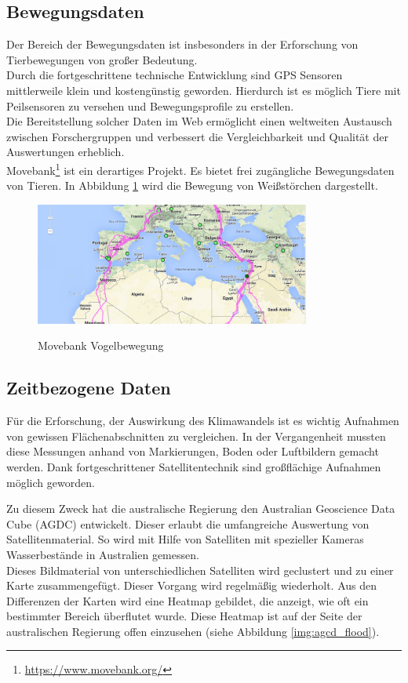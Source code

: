 \documentclass[10pt,conference,compsocconf]{IEEEtran}
\begin{document}
\subsection{Bewegungsdaten}
Der Bereich der Bewegungsdaten ist insbesonders in der Erforschung von Tierbewegungen von großer Bedeutung\cite{gps_collars}.\\
Durch die fortgeschrittene technische Entwicklung sind GPS Sensoren mittlerweile klein und kostengünstig geworden. Hierdurch ist es möglich Tiere mit Peilsensoren zu versehen und Bewegungsprofile zu erstellen.\\
Die Bereitstellung solcher Daten im Web ermöglicht einen weltweiten Austausch zwischen Forschergruppen und verbessert die Vergleichbarkeit und Qualität der Auswertungen erheblich.\\
Movebank\footnote{\url{https://www.movebank.org/}} ist ein derartiges Projekt. Es bietet frei zugängliche Bewegungsdaten von Tieren. In Abbildung \ref{img:movebank} wird die Bewegung von Weißstörchen dargestellt.

\begin{figure}[H]
  \centering
  	\includegraphics[height=114pt]{img/movebank}\\
  \caption[]{Movebank Vogelbewegung}
  \label{img:movebank}
\end{figure}


\subsection{Zeitbezogene Daten}
\label{sub:zeitbezogene_daten}
Für die Erforschung, der Auswirkung des Klimawandels ist es wichtig Aufnahmen von gewissen Flächenabschnitten zu vergleichen. In der Vergangenheit mussten diese Messungen anhand von Markierungen, Boden oder Luftbildern gemacht werden. Dank fortgeschrittener Satellitentechnik sind großflächige Aufnahmen möglich geworden.\par

Zu diesem Zweck hat die australische Regierung den Australian Geoscience Data Cube (AGDC) entwickelt. Dieser erlaubt die umfangreiche Auswertung von Satellitenmaterial. So wird mit Hilfe von Satelliten mit spezieller Kameras Wasserbestände in Australien gemessen.\\
Dieses Bildmaterial von unterschiedlichen Satelliten wird geclustert und zu einer Karte zusammengefügt. Dieser Vorgang wird regelmäßig wiederholt. Aus den Differenzen der Karten wird eine Heatmap gebildet, die anzeigt, wie oft ein bestimmter Bereich überflutet wurde. Diese Heatmap ist auf der Seite der australischen Regierung offen einzusehen (siehe Abbildung \ref{img:agcd_flood}).
\end{document}
